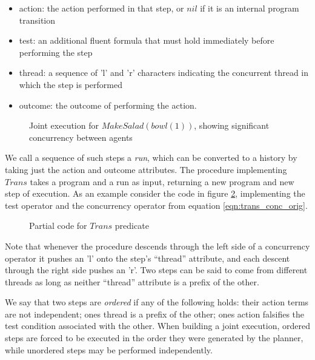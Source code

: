 \begin{itemize}
\item action: the action performed in that step, or $nil$ if it is an internal
program transition 
\item test: an additional fluent formula that must hold immediately before
performing the step 
\item thread: a sequence of 'l' and 'r' characters indicating the concurrent
thread in which the step is performed 
\item outcome: the outcome of performing the action. 
\end{itemize}
%
\begin{figure}

\caption{ Joint execution for $MakeSalad(bowl(1))$, showing significant concurrency
between agents }


\label{fig:plan-output} 
\end{figure}


We call a sequence of such steps a \emph{run}, which can be converted
to a history by taking just the action and outcome attributes. The
procedure implementing $Trans$ takes a program and a run as input,
returning a new program and new step of execution. As an example consider
the code in figure \ref{fig:trans-code}, implementing the test operator
and the concurrency operator from equation \ref{eqn:trans_conc_orig}.

%
\begin{figure}

\caption{ Partial code for $Trans$ predicate }


\label{fig:trans-code} 
\end{figure}


Note that whenever the procedure descends through the left side of
a concurrency operator it pushes an 'l' onto the step's {}``thread''
attribute, and each descent through the right side pushes an 'r'.
Two steps can be said to come from different threads as long as neither
{}``thread'' attribute is a prefix of the other.

We say that two steps are \emph{ordered} if any of the following holds:
their action terms are not independent; ones thread is a prefix of
the other; ones action falsifies the test condition associated with
the other. When building a joint execution, ordered steps are forced
to be executed in the order they were generated by the planner, while
unordered steps may be performed independently.


